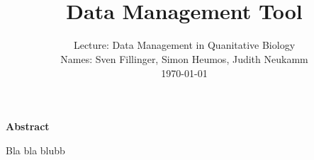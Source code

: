 \documentclass[paper=a4, fontsize=11pt]{scrartcl}	%
\title{
		\usefont{OT1}{bch}{b}{n}
		\horrule{0.5pt} \\[0.4cm]
		\LARGE Data Management Tool
		\horrule{2pt} \\%
}
\author{
		\normalfont 								\normalsize
			Lecture: Data Management in Quanitative Biology\\					\normalsize
     		Names: Sven Fillinger, Simon Heumos, Judith Neukamm\\					\normalsize
       		 \today
}
\date{}
\numberwithin{equation}{section}		%
\numberwithin{figure}{section}			%
\numberwithin{table}{section}				%
\begin{document}
\maketitle

\centerline{\bf Abstract}
Bla bla blubb
\noindent

\newpage









\newpage


\end{document}

